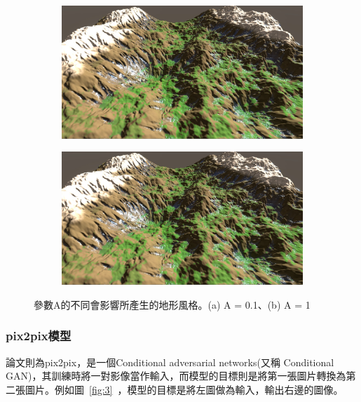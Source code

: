 \documentclass[a4paper, 12pt]{article}
\begin{document}
\begin{figure}[htbp]
  \begin{subfigure}{0.45\textwidth}
    \includegraphics[width=\linewidth]{fig/2a.jpg}
    \caption{} \label{fig:2a}
  \end{subfigure}%
  \hspace*{\fill}   %
  \begin{subfigure}{0.45\textwidth}
    \includegraphics[width=\linewidth]{fig/2a.jpg}
    \caption{} \label{fig:2b}
  \end{subfigure}%
\caption{參數A的不同會影響所產生的地形風格。(a) A = 0.1、(b) A = 1} \label{fig:2}
\end{figure}
\subsubsection{pix2pix模型}
論文\cite{isola2017image}則為pix2pix，是一個Conditional adversarial networks(又稱 Conditional GAN)，其訓練時將一對影像當作輸入，而模型的目標則是將第一張圖片轉換為第二張圖片。例如圖~\ref{fig:3}~，模型的目標是將左圖做為輸入，輸出右邊的圖像。
\end{document}
